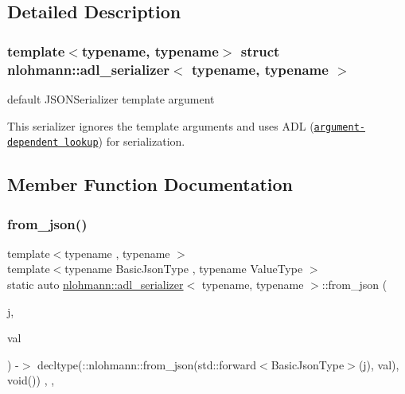 \subsection{Detailed Description}
\subsubsection*{template$<$typename, typename$>$\newline
struct nlohmann\+::adl\+\_\+serializer$<$ typename, typename $>$}

default J\+S\+O\+N\+Serializer template argument 

This serializer ignores the template arguments and uses A\+DL (\href{https://en.cppreference.com/w/cpp/language/adl}{\tt argument-\/dependent lookup}) for serialization. 

\subsection{Member Function Documentation}
\mbox{\label{structnlohmann_1_1adl__serializer_a2c544585b8b1828a0f1eecd831d0496e}} 
\subsubsection{\texorpdfstring{from\+\_\+json()}{from\_json()}}
{\footnotesize\ttfamily template$<$typename , typename $>$ \\
template$<$typename Basic\+Json\+Type , typename Value\+Type $>$ \\
static auto \mbox{\hyperlink{structnlohmann_1_1adl__serializer}{nlohmann\+::adl\+\_\+serializer}}$<$ typename, typename $>$\+::from\+\_\+json (\begin{DoxyParamCaption}\item[{Basic\+Json\+Type \&\&}]{j,  }\item[{Value\+Type \&}]{val }\end{DoxyParamCaption}) -\/$>$ decltype(\+::nlohmann\+::from\+\_\+json(std\+::forward$<$Basic\+Json\+Type$>$(j), val), void())
    \hspace{0.3cm}{\ttfamily [inline]}, {\ttfamily [static]}, {\ttfamily [noexcept]}}



